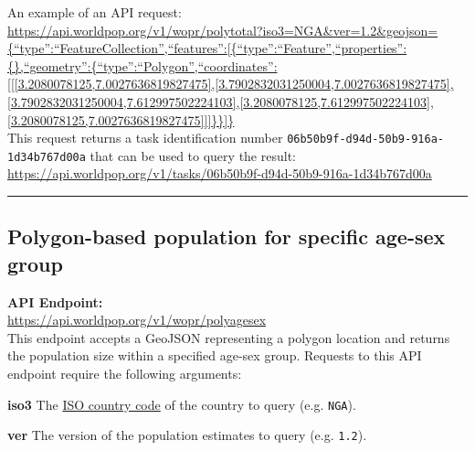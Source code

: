 \documentclass[]{article}
\begin{document}
An example of an API request:\\
\href{https://api.worldpop.org/v1/wopr/polytotal?iso3=NGA\&ver=1.2\&geojson=\%7B\%22type\%22:\%22FeatureCollection\%22,\%22features\%22:\%5B\%7B\%22type\%22:\%22Feature\%22,\%22properties\%22:\%7B\%7D,\%22geometry\%22:\%7B\%22type\%22:\%22Polygon\%22,\%22coordinates\%22:\%5B\%5B\%5B3.2080078125,7.0027636819827475\%5D,\%5B3.7902832031250004,7.0027636819827475\%5D,\%5B3.7902832031250004,7.612997502224103\%5D,\%5B3.2080078125,7.612997502224103\%5D,\%5B3.2080078125,7.0027636819827475\%5D\%5D\%5D\%7D\%7D\%5D\%7D}{https://api.worldpop.org/v1/wopr/polytotal?iso3=NGA\&ver=1.2\&geojson=\{``type'':``FeatureCollection'',``features'':{[}\{``type'':``Feature'',``properties'':\{\},``geometry'':\{``type'':``Polygon'',``coordinates'':{[}{[}{[}3.2080078125,7.0027636819827475{]},{[}3.7902832031250004,7.0027636819827475{]},{[}3.7902832031250004,7.612997502224103{]},{[}3.2080078125,7.612997502224103{]},{[}3.2080078125,7.0027636819827475{]}{]}{]}\}\}{]}\}}\\

This request returns a task identification number
\texttt{06b50b9f-d94d-50b9-916a-1d34b767d00a} that can be used to query
the result:\\
\url{https://api.worldpop.org/v1/tasks/06b50b9f-d94d-50b9-916a-1d34b767d00a}\\

\begin{center}\rule{0.5\linewidth}{0.5pt}\end{center}

\subsection{Polygon-based population for specific age-sex
group}\label{polygon-based-population-for-specific-age-sex-group}

\textbf{API Endpoint:}\\
\url{https://api.worldpop.org/v1/wopr/polyagesex}\\

This endpoint accepts a GeoJSON representing a polygon location and
returns the population size within a specified age-sex group. Requests
to this API endpoint require the following arguments:

\textbf{iso3} The
\href{https://en.wikipedia.org/wiki/ISO_3166-1_alpha-3}{ISO country
code} of the country to query (e.g. \texttt{NGA}).

\textbf{ver} The version of the population estimates to query (e.g.
\texttt{1.2}).
\end{document}
